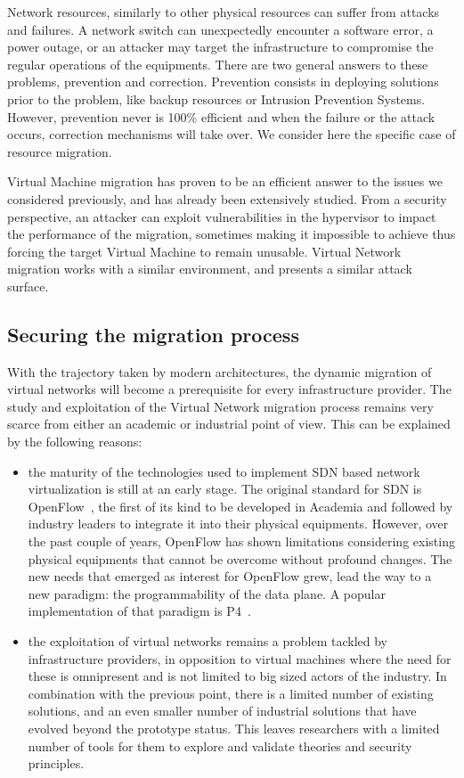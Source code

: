 Network resources, similarly to other physical resources can suffer from attacks and failures. A network switch can unexpectedly encounter a software error, a power outage, or an attacker may target the infrastructure to compromise the regular operations of the equipments. There are two general answers to these problems, prevention and correction. Prevention consists in deploying solutions prior to the problem, like backup resources or Intrusion Prevention Systems.
However, prevention never is 100\% efficient and when the failure or the attack occurs, correction mechanisms will take over. We consider here the specific case of resource migration.

Virtual Machine migration has proven to be an efficient answer to the issues we considered previously, and has already been extensively studied. From a security perspective, an attacker can exploit vulnerabilities in the hypervisor to impact the performance of the migration, sometimes making it impossible to achieve thus forcing the target Virtual Machine to remain unusable.
Virtual Network migration works with a similar environment, and presents a similar attack surface.


\subsection{Securing the migration process}
With the trajectory taken by modern architectures, the dynamic migration of virtual networks will become a prerequisite for every infrastructure provider.
The study and exploitation of the Virtual Network migration process remains very scarce from either an academic or industrial point of view. This can be explained by the following reasons:

\begin{itemize}
    \item the maturity of the technologies used to implement SDN based network virtualization is still at an early stage. The original standard for SDN is OpenFlow~\cite{Openflow-McKeown2008}, the first of its kind to be developed in Academia and followed by industry leaders to integrate it into their physical equipments. However, over the past couple of years, OpenFlow has shown limitations considering existing physical equipments that cannot be overcome without profound changes. The new needs that emerged as interest for OpenFlow grew, lead the way to a new paradigm: the programmability of the data plane. A popular implementation of that paradigm is P4~\cite{P4}.
    
    \item the exploitation of virtual networks remains a problem tackled by infrastructure providers, in opposition to virtual machines where the need for these is omnipresent and is not limited to big sized actors of the industry. In combination with the previous point, there is a limited number of existing solutions, and an even smaller number of industrial solutions that have evolved beyond the prototype status. This leaves researchers with a limited number of tools for them to explore and validate theories and security principles.
\end{itemize}


